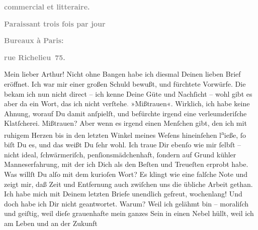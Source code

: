\begin{ledgroupsized}[t]{13cm}
           \pstart
           \begin{otherlanguage}{french}\textcolor{gray}{\textbf{commercial et litteraire.}}\end{otherlanguage}\pend
           \pstart
           \begin{otherlanguage}{french}\textcolor{gray}{\textbf{\textbf{Paraissant trois fois par jour}}}\end{otherlanguage}\pend
           \pstart
           \begin{otherlanguage}{french}\textcolor{gray}{\textbf{\textbf{Bureaux à Paris:}}}\end{otherlanguage}\pend
           \pstart
           \begin{otherlanguage}{french}\textcolor{gray}{\textbf{\textbf{rue Richelieu 75.}}}\end{otherlanguage}\pend
           \pstart\center{}Mein lieber Arthur!\pend\pstart
           Nicht ohne Bangen habe ich diesmal Deinen lieben Brief eröffnet. Ich war mir einer
               großen Schuld bewußt, und fürchtete Vorwürfe. Die bekam ich nun nicht direct – ich
               kenne Deine Güte und Nachſicht – wohl gibt es aber da ein Wort, das ich nicht
                  verſtehe\textcolor{gray}{.} »Mißtrauen«. Wirklich, ich habe keine Ahnung, worauf
               Du damit anſpielſt, und befürchte irgend eine verleumderiſche Klatſcherei. Mißtrauen?
               Aber wenn es irgend einen Menſchen gibt, den ich mit ruhigem Herzen bis in den
               letzten Winkel meines Weſens hineinſehen l\substVorne{}\textsuperscript{a}\substDazwischen{}ie\substHinten{}ße, ſo {\pb}biſt Du es, und das weißt Du ſehr
               wohl. Ich traue Dir ebenſo wie mir ſelbſt – nicht ideal, ſchwärmeriſch,
               penſionsmädchenhaft, ſondern auf Grund kühler Manneserfahrung, mit der ich Dich als
               den Beſten und Treueſten erprobt habe. Was willſt Du alſo mit dem kurioſen Wort? Es
               klingt wie eine falſche Note und zeigt mir, daß Zeit und Entfernung auch zwiſchen uns
               die übliche Arbeit gethan.\pend
           \pstart
           Ich habe mich mit Deinem letzten Briefe unendlich gefreut, wochenlang! Und doch habe
               ich Dir nicht geantwortet. Warum? Weil ich gelähmt bin – moraliſch und geiſtig, weil
                  dieſe grauenhafte \label{K_L02711-1v}\label{K_L02711-1h} mein ganzes Sein in einen Nebel hüllt, weil ich am Leben und an der Zukunft

\end{ledgroupsized}
